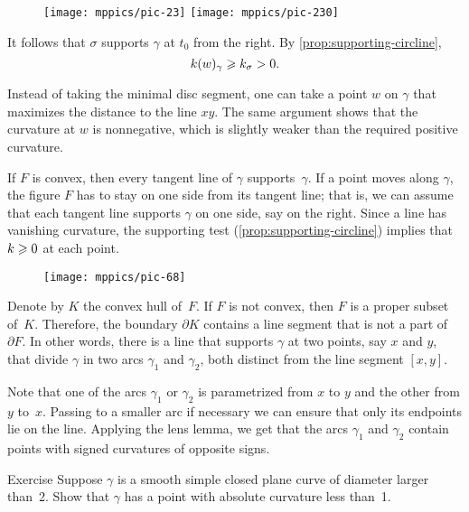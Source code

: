 {

\begin{wrapfigure}{o}{50 mm}
\vskip-4mm
\centering
\texttt{[image: mppics/pic-23]}
\bigskip
\texttt{[image: mppics/pic-230]}
\end{wrapfigure}

It follows that $\sigma$ supports $\gamma$ at $t_0$ from the right.
By \ref{prop:supporting-circline}, 
\[k(w)_\gamma\geqslant k_\sigma >0.\]
\qedsf

Instead of taking the minimal disc segment, one can take a point $w$ on $\gamma$ that maximizes the distance to the line $xy$.
The same argument shows that the curvature at $w$ is nonnegative, which is slightly weaker than the required positive curvature.

}

If $F$ is convex, then every tangent line of $\gamma$ supports~$\gamma$.
If a point moves along $\gamma$, the figure $F$ has to stay on one side from its tangent line;
that is, we can assume that each tangent line supports $\gamma$ on one side, say on the right.
Since a line has vanishing curvature, the supporting test (\ref{prop:supporting-circline}) implies that $k\geqslant 0$ at each point.

\begin{wrapfigure}{r}{35 mm}
\vskip-3mm
\centering
\texttt{[image: mppics/pic-68]}
\vskip0mm
\end{wrapfigure}

Denote by $K$ the convex hull of~$F$.
If $F$ is not convex, then $F$ is a proper subset of~$K$.
Therefore, the boundary $\partial K$ contains a line segment that is not a part of $\partial F$.
In other words, there is a line that supports $\gamma$ at two points, say $x$ and $y$, that divide $\gamma$ in two arcs $\gamma_1$ and $\gamma_2$, both distinct from the line segment $[x,y]$.

Note that one of the arcs $\gamma_1$ or $\gamma_2$ is parametrized from $x$ to $y$ and the other from $y$ to~$x$.
Passing to a smaller arc if necessary we can ensure that only its endpoints lie on the line. 
Applying the lens lemma, we get that the arcs $\gamma_1$ and $\gamma_2$ contain points with signed curvatures of opposite signs.
\qeds

\begin{thm}{Exercise}\label{ex:convex small}
Suppose $\gamma$ is a smooth simple closed plane curve of diameter larger than~2.
Show that $\gamma$ has a point with absolute curvature less than~1.
\end{thm}

